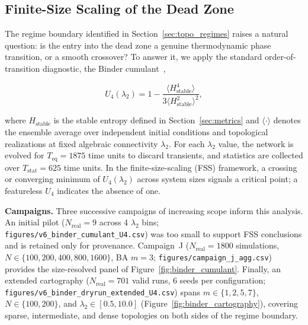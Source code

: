 ﻿\documentclass[11pt]{article}
\begin{document}
\subsection{Finite-Size Scaling of the Dead Zone}
\label{sec:binder_cumulant}

The regime boundary identified in Section~\ref{sec:topo_regimes} raises a natural question: is the entry into the dead zone a genuine thermodynamic phase transition, or a smooth crossover? To answer it, we apply the standard order-of-transition diagnostic, the Binder cumulant~\cite{binder1981finite},

\begin{equation}
U_4(\lambda_2) = 1 - \frac{\langle H_{\text{stable}}^4 \rangle}{3\langle H_{\text{stable}}^2 \rangle^2},
\end{equation}

where $H_{\text{stable}}$ is the stable entropy defined in Section~\ref{sec:metrics} and $\langle \cdot \rangle$ denotes the ensemble average over independent initial conditions and topological realizations at fixed algebraic connectivity $\lambda_2$. For each $\lambda_2$ value, the network is evolved for $T_{\text{eq}} = 1875$ time units to discard transients, and statistics are collected over $T_{\text{stat}} = 625$ time units. In the finite-size-scaling (FSS) framework, a crossing or converging minimum of $U_4(\lambda_2)$ across system sizes signals a critical point; a featureless $U_4$ indicates the absence of one.

\textbf{Campaigns.} Three successive campaigns of increasing scope inform this analysis. An initial pilot ($N_{\text{real}} = 9$ across 4 $\lambda_2$ bins; \texttt{figures/v6\_binder\_cumulant\_U4.csv}) was too small to support FSS conclusions and is retained only for provenance. Campaign~J ($N_{\text{real}} = 1800$ simulations, $N \in \{100, 200, 400, 800, 1600\}$, BA $m = 3$; \texttt{figures/campaign\_j\_agg.csv}) provides the size-resolved panel of Figure~\ref{fig:binder_cumulant}. Finally, an extended cartography ($N_{\text{real}} = 701$ valid runs, 6 seeds per configuration; \texttt{figures/v6\_binder\_dryrun\_extended\_U4.csv}) spans $m \in \{1, 2, 5, 7\}$, $N \in \{100, 200\}$, and $\lambda_2 \in [0.5, 10.0]$ (Figure~\ref{fig:binder_cartography}), covering sparse, intermediate, and dense topologies on both sides of the regime boundary.
\end{document}
